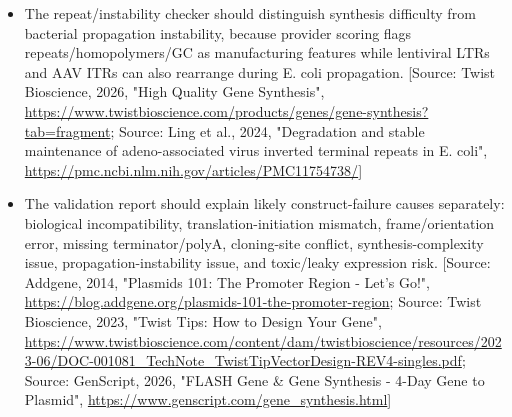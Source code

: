 \documentclass[11pt]{report}
\begin{document}
\begin{itemize}
\item The repeat/instability checker should distinguish synthesis difficulty from bacterial propagation instability, because provider scoring flags repeats/homopolymers/GC as manufacturing features while lentiviral LTRs and AAV ITRs can also rearrange during E. coli propagation. [Source: Twist Bioscience, 2026, "High Quality Gene Synthesis", \url{https://www.twistbioscience.com/products/genes/gene-synthesis?tab=fragment}; Source: Ling et al., 2024, "Degradation and stable maintenance of adeno-associated virus inverted terminal repeats in E. coli", \url{https://pmc.ncbi.nlm.nih.gov/articles/PMC11754738/}]
\item The validation report should explain likely construct-failure causes separately: biological incompatibility, translation-initiation mismatch, frame/orientation error, missing terminator/polyA, cloning-site conflict, synthesis-complexity issue, propagation-instability issue, and toxic/leaky expression risk. [Source: Addgene, 2014, "Plasmids 101: The Promoter Region - Let's Go!", \url{https://blog.addgene.org/plasmids-101-the-promoter-region}; Source: Twist Bioscience, 2023, "Twist Tips: How to Design Your Gene", \url{https://www.twistbioscience.com/content/dam/twistbioscience/resources/2023-06/DOC-001081_TechNote_TwistTipVectorDesign-REV4-singles.pdf}; Source: GenScript, 2026, "FLASH Gene \& Gene Synthesis - 4-Day Gene to Plasmid", \url{https://www.genscript.com/gene_synthesis.html}]
\end{itemize}
\end{document}
